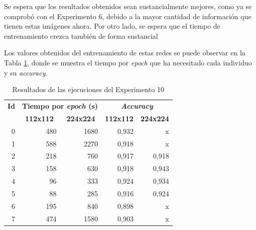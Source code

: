 Se espera que los resultados obtenidos sean sustancialmente mejores, como ya se comprobó con el Experimento 6, debido a la mayor cantidad de información que tienen estas imágenes ahora. Por otro lado, se espera que el tiempo de entrenamiento crezca también de forma sustancial

Los valores obtenidos del entrenamiento de estas redes se puede observar en la Tabla \ref{tab:exp10_resultado}, donde se muestra el tiempo por \textit{epoch} que ha necesitado cada individuo y su \textit{accuracy}.

\begin{table}[h]
\caption{Resultados de las ejecuciones del Experimento 10}
\label{tab:exp10_resultado}
\centering
\begin{tabular}{r|r|r|rr}
\toprule
\multicolumn{1}{c|}{\textbf{Id}} & \multicolumn{2}{c|}{\textbf{Tiempo por \textit{epoch} (s)}}                            & \multicolumn{2}{c}{\textbf{\textit{Accuracy}}}                                        \\
\multicolumn{1}{c|}{\textbf{}}   & \multicolumn{1}{c|}{\textbf{112x112}} & \multicolumn{1}{c|}{\textbf{224x224}} & \multicolumn{1}{c|}{\textbf{112x112}} & \multicolumn{1}{c}{\textbf{224x224}} \\ \hline
0                                & 480                                   & 1680                                  & \multicolumn{1}{r|}{0,932}            & x                                    \\
1                                & 588                                   & 2270                                  & \multicolumn{1}{r|}{0,918}            & x                                    \\
2                                & 218                                   & 760                                   & \multicolumn{1}{r|}{0,917}            & 0,918
                                    \\
3                                & 158                                   & 630                                   & \multicolumn{1}{r|}{0,918}            & 0,943                                    \\
4                                & 96                                    & 333                                   & \multicolumn{1}{r|}{0,924}            & 0,934                                    \\
5                                & 88                                    & 285                                   & \multicolumn{1}{r|}{0,916}            & 0,924
                                    \\
6                                & 195                                   & 840                                   & \multicolumn{1}{r|}{0,898}            & x                                    \\
7                                & 474                                   & 1580                                  & \multicolumn{1}{r|}{0,903}            & x       \\
\bottomrule
\end{tabular}
\end{table}

